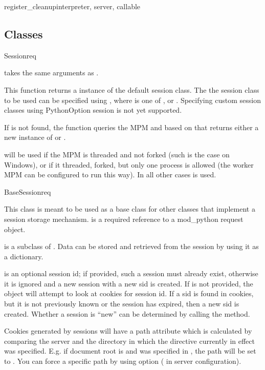 \begin{funcdesc}{register_cleanup}{interpreter, server, callable}
\subsection{Classes\label{pyapi-sess-classes}}

\begin{funcdesc}{Session}{req}

   takes the same arguments as .

  This function returns a instance of the default session class. The
  the session class to be used can be specified using 
  , where  is one of
  ,  or . Specifying
  custom session classes using PythonOption session is not yet supported.

  If  is not found, the function queries
  the MPM and based on that returns either a new instance of
   or .
  
   will be used if the MPM is threaded and not
  forked (such is the case on Windows), or if it threaded, forked, but
  only one process is allowed (the worker MPM can be configured to run
  this way). In all other cases  is used.
\end{funcdesc}

\begin{classdesc}{BaseSession}{req}

  This class is meant to be used as a base class for other classes
  that implement a session storage mechanism.  is a required
  reference to a mod_python request object.

   is a subclass of . Data can be
  stored and retrieved from the session by using it as a
  dictionary. 

   is an optional session id; if provided, such a session
  must already exist, otherwise it is ignored and a new session with a
  new sid is created. If  is not provided, the object will
  attempt to look at cookies for session id. If a sid is found in
  cookies, but it is not previously known or the session has expired,
  then a new sid is created. Whether a session is ``new'' can be
  determined by calling the  method.

  Cookies generated by sessions will have a path attribute which is
  calculated by comparing the server  and the
  directory in which the  directive currently in
  effect was specified. E.g. if document root is  and
   was specified in , the path
  will be set to . You can force a specific path by using
   option ( in server configuration).


\end{classdesc}
\end{funcdesc}
